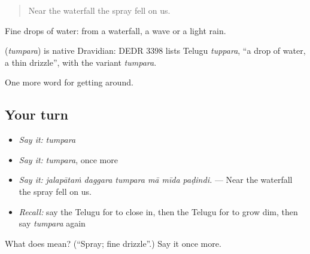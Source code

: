 \begin{quote}
Near the waterfall the spray fell on us.
\end{quote}

Fine drops of water: from a waterfall, a wave or a light rain.

\begin{cousinweb}
\textbf{} (\emph{tumpara}) is native Dravidian: DEDR 3398 lists Telugu \emph{tuppara}, \textquotedblleft{}a drop of water, a thin drizzle\textquotedblright{}, with the variant \emph{tumpara}.
\end{cousinweb}

\begin{grammarlens}[title={What you've built}]
One more word for getting around.
\end{grammarlens}

\subsection*{Your turn}
\begin{itemize}
\raggedright
  \item \emph{Say it:} \emph{tumpara}
  \item \emph{Say it:} \emph{tumpara}, once more
  \item \emph{Say it:} \emph{jalapātaṁ daggara tumpara mā mīda paḍindi.} — Near the waterfall the spray fell on us.
  \item \emph{Recall:} say the Telugu for to close in, then the Telugu for to grow dim, then say \emph{tumpara} again
\end{itemize}

\begin{tcolorbox}[breakable,colback=teal!4,colframe=teal!35!black,title={Before you move on}]
What does  mean? (\textquotedblleft{}Spray; fine drizzle\textquotedblright{}.) Say it once more.
\end{tcolorbox}
